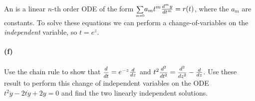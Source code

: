 \documentclass{article}
\begin{document}
\phline
\paragraph{}
An  is a linear $n$-th order ODE of the form $\scalemath{0.7}{\sum_{m=0}} a_{m}t^{m}\frac{d^{m}y}{dt^{m}} = r(t)$, where the $a_{m}$ are constants.  
To solve these equations we can perform a change-of-variables on the \emph{independent} variable, so $t = e^{z}$.

\paragraph{(f)}
Use the chain rule to show that $\fracsm{d}{dt} = e^{-z}\frac{d}{dz}$ and $t^{2}\fracsm{d^{2}}{dt^{2}} = \fracsm{d^{2}}{dz^{2}}-\frac{d}{dz}$.
Use these result to perform this change of independent variables on the ODE $t^{2}\ddot{y} - 2t\dot{y} + 2y = 0$ and find the two linearly independent solutions.
\end{document}
